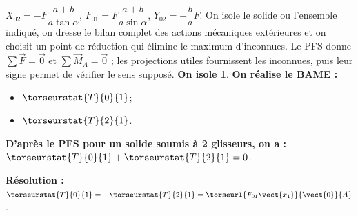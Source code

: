 \begin{corrigebox}[Corrigé]
$X_{02}=-F\dfrac{a+b}{a\tan\alpha}$, $F_{01}  =F\dfrac{a+b}{a\sin\alpha}$, $Y_{02} = -\dfrac{b}{a}F$.
On isole le solide ou l'ensemble indiqué, on dresse le bilan complet des actions mécaniques extérieures et on choisit un point de réduction qui élimine le maximum d'inconnues. Le PFS donne $\sum\vec F=\vec0$ et $\sum\vec M_A=\vec0$ ; les projections utiles fournissent les inconnues, puis leur signe permet de vérifier le sens supposé.
\textbf{On isole 1}.
\textbf{On réalise le BAME :}
\begin{itemize}
\item $\torseurstat{T}{0}{1}$;
\item $\torseurstat{T}{2}{1}$.
\end{itemize}
\textbf{D'après le PFS pour un solide soumis à 2 glisseurs, on a : }
$\torseurstat{T}{0}{1} + \torseurstat{T}{2}{1} = {0}$. 

\textbf{Résolution :} 
$ \torseurstat{T}{0}{1} = -\torseurstat{T}{2}{1}  = \torseurl{F_{01}\vect{x_1}}{\vect{0}}{A}$.
\end{corrigebox}
